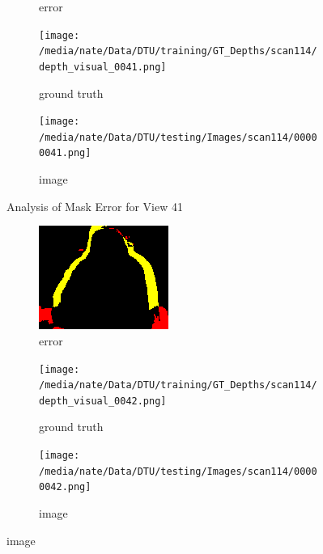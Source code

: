 \documentclass{article}
\begin{document}
\begin{figure}
\begin{subfigure}{0.3\textwidth}
		\caption{error}
		\label{fig:error41}
	\end{subfigure}
	\hfill
	\centering
	\begin{subfigure}{0.3\textwidth}
		\centering
		\texttt{[image: /media/nate/Data/DTU/training/GT\_Depths/scan114/depth\_visual\_0041.png]}
		\caption{ground truth}
		\label{fig:gt41}
	\end{subfigure}
	\hfill
	\centering
	\begin{subfigure}{0.3\textwidth}
		\centering
		\texttt{[image: /media/nate/Data/DTU/testing/Images/scan114/00000041.png]}
		\caption{image}
		\label{fig:img41}
	\end{subfigure}
	\hfill
	\caption{Analysis of Mask Error for View 41}
	\label{fig:error_analys41}
\end{figure}\begin{figure}
	\centering
	\begin{subfigure}{0.3\textwidth}
		\centering
		\includegraphics[width=\textwidth]{./output/042_error.png}
		\caption{error}
		\label{fig:error42}
	\end{subfigure}
	\hfill
	\centering
	\begin{subfigure}{0.3\textwidth}
		\centering
		\texttt{[image: /media/nate/Data/DTU/training/GT\_Depths/scan114/depth\_visual\_0042.png]}
		\caption{ground truth}
		\label{fig:gt42}
	\end{subfigure}
	\hfill
	\centering
	\begin{subfigure}{0.3\textwidth}
		\centering
		\texttt{[image: /media/nate/Data/DTU/testing/Images/scan114/00000042.png]}
		\caption{image}

\end{subfigure}
\end{figure}
\end{document}
